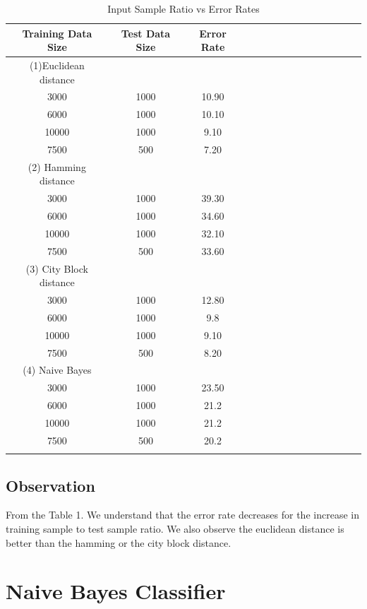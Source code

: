 \documentclass[10pt, letterpaper]{article}
\begin{document}
\begin{table}
\centering
  \begin{tabular}{*{15}{c}}
    \hline
    Training Data Size & Test Data Size & Error Rate\\
    \hline
    \hline
     (1)Euclidean distance \\
    \hline
   3000 & 1000 & 10.90 \\
    \hline
    6000 & 1000 & 10.10\\
    \hline
    10000 & 1000 & 9.10\\
    \hline
     7500 & 500 & 7.20 \\
     \hline
     (2) Hamming distance\\
     \hline
   3000 & 1000 & 39.30 \\
    \hline
    6000 & 1000 & 34.60\\
    \hline
    10000 & 1000 & 32.10\\
    \hline
     7500 & 500 & 33.60 \\
     \hline
     (3) City Block distance\\
     \hline
   3000 & 1000 & 12.80 \\
    \hline
    6000 & 1000 & 9.8\\
    \hline
    10000 & 1000 & 9.10\\
    \hline
     7500 & 500 & 8.20 \\

     \hline
     (4) Naive Bayes\\
     \hline
   3000 & 1000 & 23.50 \\
    \hline
    6000 & 1000 & 21.2\\
    \hline
    10000 & 1000 & 21.2\\
    \hline
     7500 & 500 & 20.2\\
    \hline\\
  \end{tabular}
 \caption{Input Sample Ratio vs Error Rates}
 \label{table:Input Sample Ratio vs Error Rates}
\end{table}

\subsection{Observation}
From the Table 1. We understand that the error rate decreases for the increase in training sample to test sample ratio.  We also observe the euclidean distance is better than the hamming or the city block distance.

\section{Naive Bayes Classifier}
\end{document}
